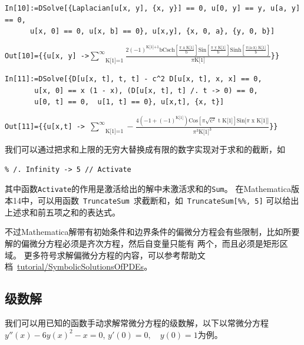 \documentclass[UTF8,a4paper,10pt]{ctexart}
\newcommand{\mma}{Mathematica}
\begin{document}
\verb|In[10]:=DSolve[{Laplacian[u[x, y], {x, y}] == 0, u[0, y] == y, u[a, y] == 0,|\\
\verb|      u[x, 0] == 0, u[x, b] == 0}, u[x,y], {x, 0, a}, {y, 0, b}]|

\verb|Out[10]={{u[x, y] ->|$\underset{\text{K[1]=1}}{\overset{\infty }{\sum }}\frac{2 (-1)^\text{K[1]+1} \text{b} \text{Csch}[\frac{\pi  \text{ a K[1]}}{\text{b}}] \text{Sin} [\frac{\pi  \text{ y K[1]}}{\text{b}}] \text{Sinh} [\frac{\pi  \text{(a-x) K[1]}}{\text{b}}]}{\pi  \text{K[1]}}$\verb|}}|

\verb|In[11]:=DSolve[{D[u[x, t], t, t] - c^2 D[u[x, t], x, x] == 0,|\\
\verb|       u[x, 0] == x (1 - x), (D[u[x, t], t] /. t -> 0) == 0,|\\
\verb|       u[0, t] == 0,  u[1, t] == 0}, u[x,t], {x, t}]|

\verb|Out[11]={{u[x,t] -> |$\underset{\text{K[1]=1}}{\overset{\infty }{\sum }}-\frac{4 \left(-1+(-1)^{\text{K[1]}}\right)\text{Cos}[\pi  \sqrt{\text{c}^2} \text{ t K[1]}] \text{Sin[} \pi  \text{ x K[1]}] }{\pi ^3 \text{K[1]}^3}$\verb|}}|


我们可以通过把求和上限的无穷大替换成有限的数字实现对于求和的截断，如

\begin{lstlisting}
% /. Infinity -> 5 // Activate
\end{lstlisting}
其中函数\verb|Activate|的作用是激活给出的解中未激活求和的\verb|Sum|。
在\mma 版本14中，可以用函数~\verb|TruncateSum|~求截断和，如~\verb|TruncateSum[%%, 5]| 
可以给出上述求和前五项之和的表达式。

不过Mathematica解带有初始条件和边界条件的偏微分方程会有些限制，比如所要解的偏微分方程必须是齐次方程，然后自变量只能有
两个，而且必须是矩形区域。
更多符号求解偏微分方程的内容，可以参考帮助文档~\href{http://reference.wolfram.com/language/tutorial/SymbolicSolutionsOfPDEs.html}{tutorial/SymbolicSolutionsOfPDEs}。

\subsection{级数解}

我们可以用已知的函数手动求解常微分方程的级数解，以下以常微分方程$y''(x)-6y(x)^2-x=0$, $y'(0)=0, \quad y(0)=1$为例。
\end{document}
